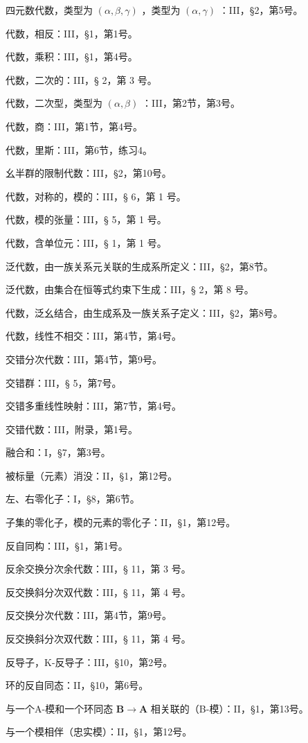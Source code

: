四元数代数，类型为 \((\alpha, \beta, \gamma)\) ，类型为 \((\alpha, \gamma)\) ：III，§2，第5号。

代数，相反：III，§1，第1号。

代数，乘积：III，§1，第4号。

代数，二次的：III，§ 2，第 3 号。

代数，二次型，类型为 \((\alpha, \beta)\) ：III，第2节，第3号。

代数，商：III，第1节，第4号。

代数，里斯：III，第6节，练习4。

幺半群的限制代数：III，§2，第10号。

代数，对称的，模的：III，§ 6，第 1 号。

代数，模的张量：III，§ 5，第 1 号。

代数，含单位元：III，§ 1，第 1 号。

泛代数，由一族关系元关联的生成系所定义：III，§2，第8节。

泛代数，由集合在恒等式约束下生成：III，§ 2，第 8 号。

代数，泛幺结合，由生成系及一族关系子定义：III，§2，第8号。

代数，线性不相交：III，第4节，第4号。

交错分次代数：III，第4节，第9号。

交错群：III，§ 5，第7号。

交错多重线性映射：III，第7节，第4号。

交错代数：III，附录，第1号。

融合和：I，§7，第3号。

被标量（元素）消没：II，§1，第12号。

左、右零化子：I，§8，第6节。

子集的零化子，模的元素的零化子：II，§1，第12号。

反自同构：III，§1，第1号。

反余交换分次余代数：III，§ 11，第 3 号。

反交换斜分次双代数：III，§ 11，第 4 号。

反交换分次代数：III，第4节，第9号。

反交换斜分次双代数：III，§ 11，第 4 号。

反导子，K-反导子：III，§10，第2号。

环的反自同态：II，§10，第6号。

与一个A-模和一个环同态 \(\mathbf{B} \to \mathbf{A}\) 相关联的（B-模）：II，§1，第13号。

与一个模相伴（忠实模）：II，§1，第12号。

